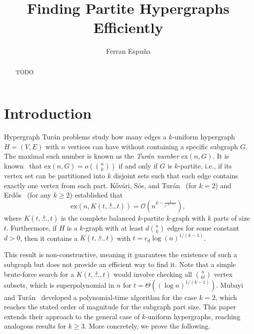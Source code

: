 \documentclass[12pt]{article}
\title{Finding Partite Hypergraphs Efficiently}
\author{Ferran Espuña\authornote{1}
}
\newcommand{\ex}[2]{\ensuremath{\mathrm{ex}(#1, #2)}}
\newcommand{\compoverset}[2]{\ensuremath{K(#2, \overset{#1}{\dots}, #2)}}
\newcommand{\bigO}[1]{\ensuremath{\mathcal{O}\left(#1\right)}}
\begin{document}
\maketitle


\begin{abstract}
  TODO %
\end{abstract}

\section{Introduction}\label{sec:introduction}

Hypergraph Turán problems study how many edges a $k$-uniform hypergraph $H = (V, E)$ with $n$ vertices can have without containing a specific subgraph $G$.
The maximal such number is known as the \emph{Turán number} $\ex{n}{G}$.
It is known~\cite{keevash2011hypergraph}
that $\ex{n}{G} = o\left( \binom{n}{k}\right)$ if and only if $G$ is $k$-partite, i.e.,
if its vertex set can be partitioned into $k$ disjoint sets such that each edge contains exactly one vertex from each part.
Kővári, Sós, and Turán~\cite{Kovari1954} (for $k=2$) and
Erdős~\cite{Erods1964} (for any $k \geq 2$) established that
\[ \label{eq:erdos64-intro}
    \ex{n}{\compoverset{k}{t}} = \bigO{n^{k - \frac{1}{t^{(k-1)}}}},
\]
where $\compoverset{k}{t}$ is the complete balanced $k$-partite $k$-graph with $k$ parts of size $t$.
Furthermore, if $H$ is a $k$-graph with at least $d \binom{n}{k}$ edges for some constant $d > 0$, then it contains a $\compoverset{k}{t}$ with
$t = c_d \log(n)^{1/(k-1)}$.

This result is non-constructive, meaning it guarantees the existence of such a subgraph but does not provide an efficient way to find it.
Note that a simple brute-force search for a $\compoverset{k}{t}$ would involve checking all $\binom{n}{kt}$ vertex subsets, which is superpolynomial in $n$ for $t = \Theta((\log n)^{1/(k-1)})$.
Mubayi and Turán~\cite{MUBAYI2010174} developed a polynomial-time algorithm for the case $k=2$, which reaches the stated order of magnitude for the subgraph part size.
This paper extends their approach to the general case of $k$-uniform hypergraphs, reaching analogous results for $k \ge 3$.
More concretely, we prove the following.
\end{document}
